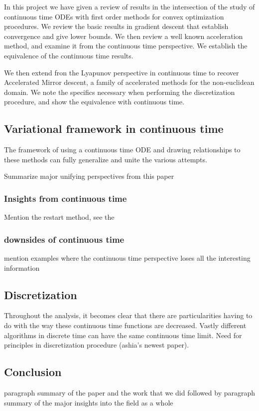 In this project we have given a review of results in the intersection of the study of continuous time ODEs with first order methods for convex optimization procedures. We review the basic results in gradient descent that establish convergence and give lower bounds. We then review a well known acceleration method, and examine it from the continuous time perspective. We establish the equivalence of the continuous time results.

We then extend fron the Lyapunov perspective in continuous time to recover Accelerated Mirror descent, a family of accelerated methods for the non-euclidean domain. We note the specifics necessary when performing the discretization procedure, and show the equivalence with continuous time. 

\subsection{Variational framework in continuous time}
The framework of using a continuous time ODE and drawing relationships to these methods can fully generalize and unite the various attempts. 

Summarize major unifying perspectives from this paper

\subsubsection{Insights from continuous time}
Mention the restart method, see the  

\subsubsection{downsides of continuous time}
mention examples where the continuous time perspective loses all the interesting information

\subsection{Discretization}
Throughout the analysis, it becomes clear that there are particularities having to do with the way these continuous time functions are decreased. Vastly different algorithms in discrete time can have the same continuous time limit. Need for principles in discretization procedure (ashia's newest paper).

\subsection{Conclusion}
paragraph summary of the paper and the work that we did followed by paragraph summary of the major insights into the field as a whole